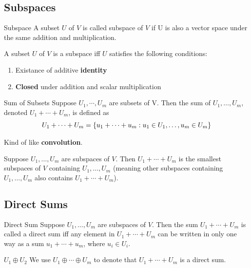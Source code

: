 \documentclass[12pt,a4paper]{article}
\begin{document}
    \subsection{Subspaces}
    \begin{defi}{Subspace}
        A subset $U$ of $V$ is called subspace of $V$ if U is also a vector space under the same addition and multiplication.
    \end{defi}
    \begin{remark}
        A subset $U$ of $V$ is a subspace iff $U$ satisfies the following conditions:
        \begin{enumerate}
            \item Existance of additive \textbf{identity}
            \item \textbf{Closed} under addition and scalar multiplication
        \end{enumerate}
    \end{remark}
    \hfill

    \begin{defi}{Sum of Subsets}
        Suppose $U_1,\cdots,U_m$ are subsets of V. Then the sum of $U_1,\dots,U_m$, denoted $U_1+\cdots+U_m$, is defined as
        $$
        U_1+\cdots+U_m=\left\{u_1+\cdots+u_m:u_1\in U_1,\dots,u_m\in U_m\right\}
        $$
    \end{defi}
    \begin{remark}
        Kind of like \textbf{convolution}.
    \end{remark}
    \hfill
    
    \begin{prop}\label{1.6}
        Suppose $U_1,\dots,U_m$ are subspaces of $V$. Then $U_1+\cdots+U_m$ is the smallest subspaces of $V$ containing $U_1,\dots,U_m$ (meaning other subspaces containing $U_1,\dots,U_m$ also contains $U_1+\cdots+U_m$).
    \end{prop}
    \hfill

    \subsection{Direct Sums}
    \begin{defi}{Direct Sum}
        Suppose $U_1,\dots,U_m$ are subspaces of $V$. Then the sum $U_1+\cdots+U_m$ is called a direct sum iff any element in $U_1+\cdots+U_m$ can be written in only one way as a sum $u_1+\cdots+u_m$, where $u_i\in U_i$.
    \end{defi}
    \begin{notation}{$U_1\oplus U_2$}
        We use $U_1\oplus\cdots\oplus U_m$ to denote that $U_1+\cdots+U_m$ is a direct sum. 
    \end{notation}
    \hfill
\end{document}
